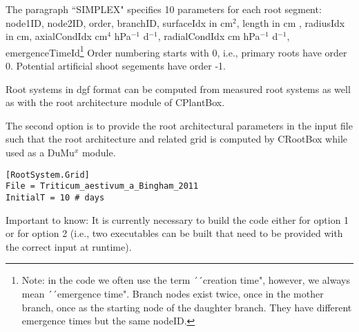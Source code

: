 The paragraph ``SIMPLEX" specifies 10 parameters for each root segment: node1ID, node2ID, order, branchID, surfaceIdx in cm$^2$, length in cm , radiusIdx in cm, axialCondIdx cm$^4$ hPa$^{-1}$ d$^{-1}$, radialCondIdx cm hPa$^{-1}$ d$^{-1}$, emergenceTimeId\footnote{Note: in the code we often use the term ´´creation time", however, we always mean ´´emergence time". Branch nodes exist twice, once in the mother branch, once as the starting node of the daughter branch. They have different emergence times but the same nodeID.} Order numbering starts with 0, i.e., primary roots have order 0. Potential artificial shoot segements have order -1. 

Root systems in dgf format can be computed from measured root systems as well as with the root architecture module of CPlantBox. 

The second option is to provide the root architectural parameters in the input file such that the root architecture and related grid is computed by CRootBox while used as a DuMu$^x$ module. 

\begin{lstlisting}
[RootSystem.Grid]
File = Triticum_aestivum_a_Bingham_2011  
InitialT = 10 # days
\end{lstlisting}

Important to know: It is currently necessary to build the code either for option 1 or for option 2 (i.e., two executables can be built that need to be provided with the correct input at runtime). 